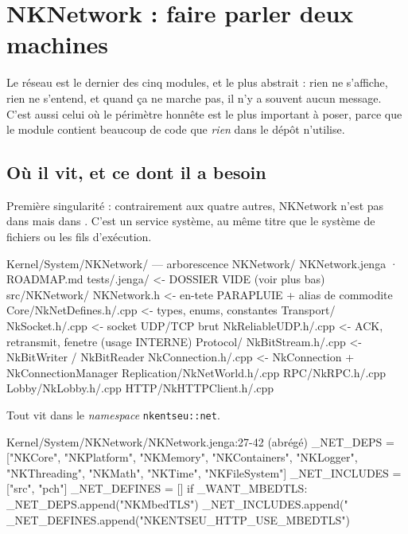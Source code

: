 \chapter{NKNetwork : faire parler deux machines}

Le réseau est le dernier des cinq modules, et le plus abstrait : rien ne
s'affiche, rien ne s'entend, et quand ça ne marche pas, il n'y a souvent aucun
message. C'est aussi celui où le périmètre honnête est le plus important à
poser, parce que le module contient beaucoup de code que \emph{rien} dans le
dépôt n'utilise.

\section{Où il vit, et ce dont il a besoin}

Première singularité : contrairement aux quatre autres, NKNetwork n'est pas dans
 mais dans . C'est un service
système, au même titre que le système de fichiers ou les fils d'exécution.

\begin{nkcode}{Kernel/System/NKNetwork/ — arborescence}
NKNetwork/
  NKNetwork.jenga · ROADMAP.md
  tests/.jenga/                 <- DOSSIER VIDE (voir plus bas)
  src/NKNetwork/
    NKNetwork.h                  <- en-tete PARAPLUIE + alias de commodite
    Core/NkNetDefines.h/.cpp     <- types, enums, constantes
    Transport/
      NkSocket.h/.cpp            <- socket UDP/TCP brut
      NkReliableUDP.h/.cpp       <- ACK, retransmit, fenetre (usage INTERNE)
    Protocol/
      NkBitStream.h/.cpp         <- NkBitWriter / NkBitReader
      NkConnection.h/.cpp        <- NkConnection + NkConnectionManager
    Replication/NkNetWorld.h/.cpp
    RPC/NkRPC.h/.cpp
    Lobby/NkLobby.h/.cpp
    HTTP/NkHTTPClient.h/.cpp
\end{nkcode}

Tout vit dans le \emph{namespace} \texttt{nkentseu::net}.

\begin{nkcode}{Kernel/System/NKNetwork/NKNetwork.jenga:27-42 (abrégé)}
_NET_DEPS = ["NKCore", "NKPlatform", "NKMemory", "NKContainers", "NKLogger", "NKThreading", "NKMath", "NKTime", "NKFileSystem"]
_NET_INCLUDES = ["src", "pch"]
_NET_DEFINES = []
if _WANT_MBEDTLS:
    _NET_DEPS.append("NKMbedTLS")
    _NET_INCLUDES.append("%
    _NET_DEFINES.append("NKENTSEU_HTTP_USE_MBEDTLS")
\end{nkcode}

